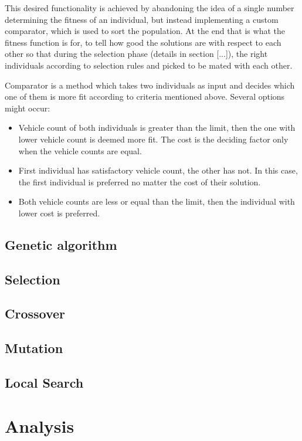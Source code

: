 \documentclass[twoside]{ctuthesis}
\theoremstyle{plain}
\theoremstyle{definition}
\theoremstyle{note}
\begin{document}
This desired functionality is achieved by abandoning the idea of a single number determining the fitness of an individual, but instead implementing a custom comparator, which is used to sort the population. At the end that is what the fitness function is for, to tell how good the solutions are with respect to each other so that during the selection phase (details in section [...]), the right individuals according to selection rules and picked to be mated with each other. 

Comparator is a method which takes two individuals as input and decides which one of them is more fit according to criteria mentioned above. Several options might occur:
\begin{itemize}
	\item Vehicle count of both individuals is greater than the limit, then the one with lower vehicle count is deemed more fit. The cost is the deciding factor only when the vehicle counts are equal.
	\item First individual has satisfactory vehicle count, the other has not. In this case, the first individual is preferred no matter the cost of their solution.
	\item Both vehicle counts are less or equal than the limit, then the individual with lower cost is preferred.
\end{itemize}


\subsection{Genetic algorithm}

\subsection{Selection}
\subsection{Crossover}
\subsection{Mutation}
\subsection{Local Search}

\section{Analysis}





\end{document}
